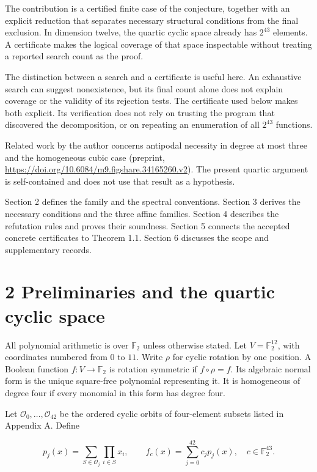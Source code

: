 \documentclass[11pt,a4paper]{article}
\begin{document}
The contribution is a certified finite case of the conjecture, together with an explicit reduction that separates necessary structural conditions from the final exclusion. In dimension twelve, the quartic cyclic space already has $2^{43}$ elements. A certificate makes the logical coverage of that space inspectable without treating a reported search count as the proof.

The distinction between a search and a certificate is useful here. An exhaustive search can suggest nonexistence, but its final count alone does not explain coverage or the validity of its rejection tests. The certificate used below makes both explicit. Its verification does not rely on trusting the program that discovered the decomposition, or on repeating an enumeration of all $2^{43}$ functions.

Related work by the author concerns antipodal necessity in degree at most three and the homogeneous cubic case (preprint, \url{https://doi.org/10.6084/m9.figshare.34165260.v2}). The present quartic argument is self-contained and does not use that result as a hypothesis.

Section 2 defines the family and the spectral conventions. Section 3 derives the necessary conditions and the three affine families. Section 4 describes the refutation rules and proves their soundness. Section 5 connects the accepted concrete certificates to Theorem 1.1. Section 6 discusses the scope and supplementary records.

\section*{2 Preliminaries and the quartic cyclic space}

All polynomial arithmetic is over $\mathbb F_2$ unless otherwise stated. Let $V=\mathbb F_2^{12}$, with coordinates numbered from $0$ to $11$. Write $\rho$ for cyclic rotation by one position. A Boolean function $f:V\to\mathbb F_2$ is rotation symmetric if $f\circ\rho=f$. Its algebraic normal form is the unique square-free polynomial representing it. It is homogeneous of degree four if every monomial in this form has degree four.

Let $\mathcal O_0,\ldots,\mathcal O_{42}$ be the ordered cyclic orbits of four-element subsets listed in Appendix A. Define

\[
p_j(x)=\sum_{S\in\mathcal O_j}\prod_{i\in S}x_i,
\qquad f_c(x)=\sum_{j=0}^{42}c_jp_j(x),\quad c\in\mathbb F_2^{43}. \tag{2.1}
\]
\end{document}
